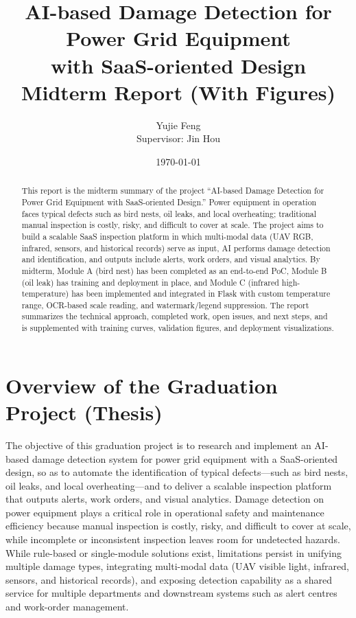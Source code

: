 \documentclass[12pt,a4paper]{article}
\title{AI-based Damage Detection for Power Grid Equipment\\with SaaS-oriented Design\\Midterm Report (With Figures)}
\author{Yujie Feng\\Supervisor: Jin Hou}
\date{\today}
\begin{document}
\maketitle

\begin{abstract}
This report is the midterm summary of the project ``AI-based Damage Detection for Power Grid Equipment with SaaS-oriented Design.'' Power equipment in operation faces typical defects such as bird nests, oil leaks, and local overheating; traditional manual inspection is costly, risky, and difficult to cover at scale. The project aims to build a scalable SaaS inspection platform in which multi-modal data (UAV RGB, infrared, sensors, and historical records) serve as input, AI performs damage detection and identification, and outputs include alerts, work orders, and visual analytics. By midterm, Module A (bird nest) has been completed as an end-to-end PoC, Module B (oil leak) has training and deployment in place, and Module C (infrared high-temperature) has been implemented and integrated in Flask with custom temperature range, OCR-based scale reading, and watermark/legend suppression. The report summarizes the technical approach, completed work, open issues, and next steps, and is supplemented with training curves, validation figures, and deployment visualizations.
\end{abstract}

\tableofcontents
\newpage

\section{Overview of the Graduation Project (Thesis)}

The objective of this graduation project is to research and implement an AI-based damage detection system for power grid equipment with a SaaS-oriented design, so as to automate the identification of typical defects---such as bird nests, oil leaks, and local overheating---and to deliver a scalable inspection platform that outputs alerts, work orders, and visual analytics. Damage detection on power equipment plays a critical role in operational safety and maintenance efficiency because manual inspection is costly, risky, and difficult to cover at scale, while incomplete or inconsistent inspection leaves room for undetected hazards. While rule-based or single-module solutions exist, limitations persist in unifying multiple damage types, integrating multi-modal data (UAV visible light, infrared, sensors, and historical records), and exposing detection capability as a shared service for multiple departments and downstream systems such as alert centres and work-order management.
\end{document}
